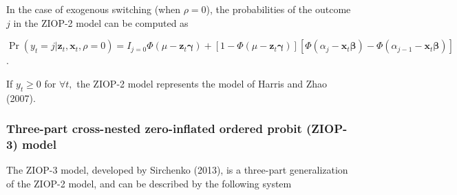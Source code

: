\documentclass[letterpaper,fleqn,12pt]{article}
\begin{document}
\begin{onehalfspace}
In the case of exogenous switching (when $\rho =0$), the probabilities of
the outcome $j$ in the ZIOP-2 model can be computed as

\begin{center}
$\Pr (y_{t}=j|\mathbf{z}_{t},\mathbf{x}_{t},\rho =0)=I_{j=0}\Phi (\mu -%
\mathbf{z}_{t}\mathbf{\gamma })+[1-\Phi (\mu -\mathbf{z}_{t}\mathbf{\gamma }%
)][\Phi (\alpha _{j}-\mathbf{x}_{t}\mathbf{\beta })-\Phi (\alpha _{j-1}-%
\mathbf{x}_{t}\mathbf{\beta })]$.
\end{center}

If $y_{t}\geq 0$ for $\forall t,$ the ZIOP-2 model represents the model of
Harris and Zhao (2007).

\subsubsection*{Three-part cross-nested zero-inflated ordered probit
(ZIOP-3) model}

The ZIOP-3 model, developed by Sirchenko (2013), is a three-part
generalization of the ZIOP-2 model, and can be described by the following
system

\medskip


\end{onehalfspace}
\end{document}
